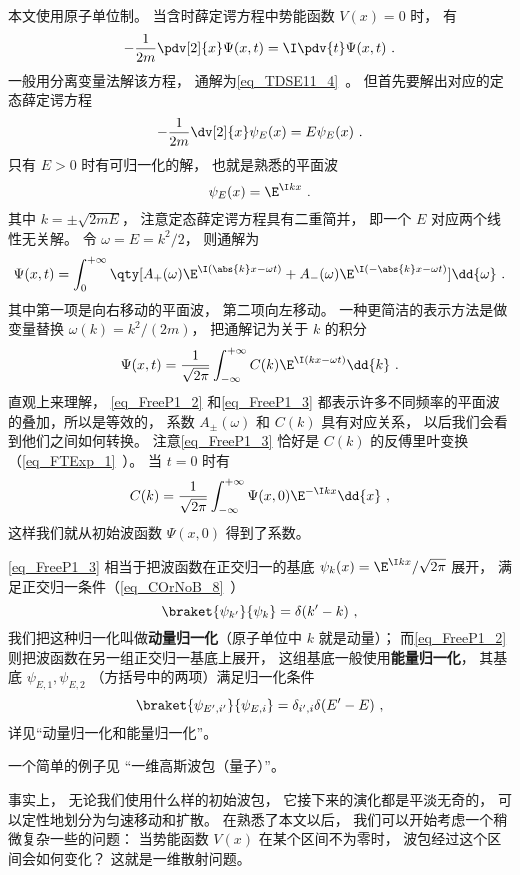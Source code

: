 

本文使用原子单位制。 当含时薛定谔方程中势能函数 $V(x) = 0$ 时， 有
\begin{equation}\label{eq_FreeP1_1}
-\frac{1}{2m}\pdv[2]{x}\Psi(x,t) = \I \pdv{t} \Psi(x,t)~.
\end{equation}
一般用分离变量法解该方程， 通解为\autoref{eq_TDSE11_4}~。 但首先要解出对应的定态薛定谔方程
\begin{equation}
-\frac{1}{2m}\dv[2]{x}\psi_E(x) = E \psi_E(x)~.
\end{equation}
只有 $E > 0$ 时有可归一化的解， 也就是熟悉的平面波
\begin{equation}
\psi_E(x) = \E^{\I k x}~.
\end{equation}
其中 $k = \pm\sqrt{2mE}$， 注意定态薛定谔方程具有二重简并， 即一个 $E$ 对应两个线性无关解。 令 $\omega = E = k^2/2$， 则通解为
\begin{equation}\label{eq_FreeP1_2}
\Psi(x,t) = \int_{0}^{+\infty} \qty[A_+(\omega) \E^{\I (\abs{k}x - \omega t)} + A_-(\omega) \E^{\I (-\abs{k}x - \omega t)}] \dd{\omega}~.
\end{equation}
其中第一项是向右移动的平面波， 第二项向左移动。 一种更简洁的表示方法是做变量替换 $\omega(k) = k^2/(2m)$， 把通解记为关于 $k$ 的积分
\begin{equation}\label{eq_FreeP1_3}
\Psi(x,t) = \frac{1}{\sqrt{2\pi}} \int_{-\infty}^{+\infty} C(k) \E^{\I (k x - \omega t)} \dd{k}~.
\end{equation}
直观上来理解， \autoref{eq_FreeP1_2} 和\autoref{eq_FreeP1_3} 都表示许多不同频率的平面波的叠加，所以是等效的， 系数 $A_\pm(\omega)$ 和 $C(k)$ 具有对应关系， 以后我们会看到他们之间如何转换。 注意\autoref{eq_FreeP1_3} 恰好是 $C(k)$ 的反傅里叶变换（\autoref{eq_FTExp_1}~）。 当 $t = 0$ 时有
\begin{equation}
C(k) = \frac{1}{\sqrt{2\pi}} \int_{-\infty}^{+\infty} \Psi(x,0) \E^{-\I k x} \dd{x}~,
\end{equation}
这样我们就从初始波函数 $\Psi(x,0)$ 得到了系数。

\autoref{eq_FreeP1_3} 相当于把波函数在正交归一的基底 $\psi_k(x) = \E^{\I kx}/\sqrt{2\pi}$ 展开， 满足正交归一条件（\autoref{eq_COrNoB_8}~）
\begin{equation}
\braket{\psi_{k'}}{\psi_k} = \delta(k' - k)~,
\end{equation}
我们把这种归一化叫做\textbf{动量归一化}（原子单位中 $k$ 就是动量）； 而\autoref{eq_FreeP1_2} 则把波函数在另一组正交归一基底上展开， 这组基底一般使用\textbf{能量归一化}， 其基底 $\psi_{E,1}, \psi_{E,2}$ （方括号中的两项）满足归一化条件
\begin{equation}
\braket{\psi_{E',i'}}{\psi_{E,i}} = \delta_{i',i}\delta(E' - E)~,
\end{equation}
详见“动量归一化和能量归一化”。

一个简单的例子见 “一维高斯波包（量子）”。

事实上， 无论我们使用什么样的初始波包， 它接下来的演化都是平淡无奇的， 可以定性地划分为匀速移动和扩散。 在熟悉了本文以后， 我们可以开始考虑一个稍微复杂一些的问题： 当势能函数 $V(x)$ 在某个区间不为零时， 波包经过这个区间会如何变化？ 这就是一维散射问题。
